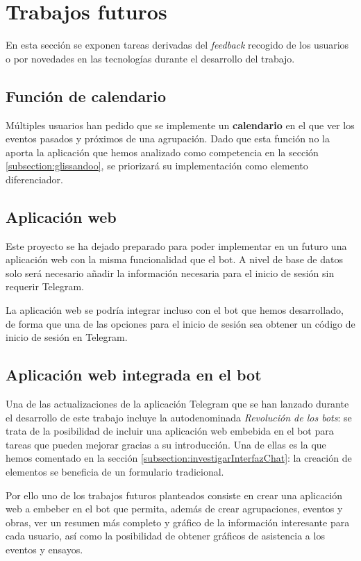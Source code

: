 \section{Trabajos futuros}

En esta sección se exponen tareas derivadas del \textit{feedback} recogido de los usuarios o por novedades en las tecnologías durante el desarrollo del trabajo.

\subsection{Función de calendario}

Múltiples usuarios han pedido que se implemente un \textbf{calendario} en el que ver los eventos pasados y próximos de una agrupación. Dado que esta función no la aporta la aplicación que hemos analizado como competencia en la sección \ref{subsection:glissandoo}, se priorizará su implementación como elemento diferenciador.

\subsection{Aplicación web}

Este proyecto se ha dejado preparado para poder implementar en un futuro una aplicación web con la misma funcionalidad que el bot. A nivel de base de datos solo será necesario añadir la información necesaria para el inicio de sesión sin requerir Telegram.

La aplicación web se podría integrar incluso con el bot que hemos desarrollado, de forma que una de las opciones para el inicio de sesión sea obtener un código de inicio de sesión en Telegram.

\subsection{Aplicación web integrada en el bot}

Una de las actualizaciones de la aplicación Telegram que se han lanzado durante el desarrollo de este trabajo incluye la autodenominada \textit{Revolución de los bots}\cite{telegramWebappUpdate}: se trata de la posibilidad de incluir una aplicación web embebida en el bot para tareas que pueden mejorar gracias a su introducción. Una de ellas es la que hemos comentado en la sección \ref{subsection:investigarInterfazChat}: la creación de elementos se beneficia de un formulario tradicional. 

Por ello uno de los trabajos futuros planteados consiste en crear una aplicación web a embeber en el bot que permita, además de crear agrupaciones, eventos y obras, ver un resumen más completo y gráfico de la información interesante para cada usuario, así como la posibilidad de obtener gráficos de asistencia a los eventos y ensayos.
